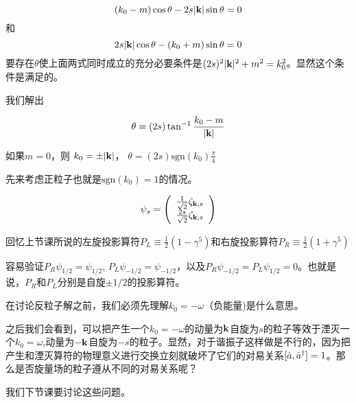 \documentclass[CJK]{beamer}
\begin{document}
\begin{frame}
\bch
$$(k_0-m)\cos\theta - 2s |\veck| \sin\theta = 0$$
和
$$ 2s|\veck| \cos\theta - (k_0+m) \sin\theta = 0$$
要存在$\theta$使上面两式同时成立的充分必要条件是$(2s)^2 |\veck|^2 + m^2 = k_0^2$。显然这个条件是满足的。

\skipline
我们解出

$$\theta = (2s) \tan^{-1} \frac{k_0-m}{|\veck|}$$

\ech
\end{frame}


\begin{frame}
\bch
如果$m = 0$，则 $k_0 = \pm |\veck|$， $\theta = (2s)\mathrm{sgn}(k_0)\frac{\pi}{4}$

先来考虑正粒子也就是$\mathrm{sgn}(k_0) = 1$的情况。

\begin{equation}
\psi_s =  \bmat{c}
\frac{1}{\sqrt{2}} \zeta_{\veck,s} \\
\frac{2s}{\sqrt{2}} \zeta_{\veck,s} \nonumber
\emat
\end{equation}

回忆上节课所说的左旋投影算符$P_L \equiv \frac{1}{2}(1-\gamma^5)$和右旋投影算符$P_R\equiv \frac{1}{2}(1+\gamma^5)$

容易验证$P_R \psi_{1/2} = \psi_{1/2}$, $P_L\psi_{-1/2} = \psi_{-1/2}$，以及$P_R \psi_{-1/2} = P_L \psi_{1/2}= 0$。也就是说，$P_R$和$P_L$分别是自旋$\pm 1/2$的投影算符。

\ech
\end{frame}

\begin{frame}
\bch
在讨论反粒子解之前，我们必须先理解$k_0 = -\omega$（负能量)是什么意思。


\skipline
之后我们会看到，可以把产生一个$k_0 = -\omega$的动量为$\veck$自旋为$s$的粒子等效于湮灭一个$k_0 = \omega$,动量为$-\veck$自旋为$-s$的粒子。显然，对于谐振子这样做是不行的，因为把产生和湮灭算符的物理意义进行交换立刻就破坏了它们的对易关系$[\hata,\adag]=1$。那么是否旋量场的粒子遵从不同的对易关系呢？

\skipline

我们下节课要讨论这些问题。
\ech
\end{frame}
\end{document}
